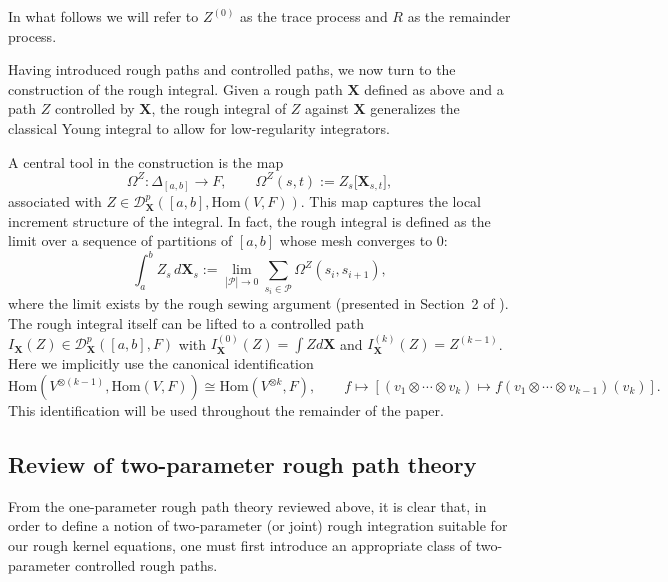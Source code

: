 \documentclass{article}%
\begin{document}
In what follows we will refer to $Z^{(0)}$ as the trace process and $R$ as the remainder process.\newline

Having introduced rough paths and controlled paths, we now turn to the construction of the rough integral.  
Given a rough path $\mathbf{X}$ defined as above and a path $Z$ controlled by $\mathbf{X}$, the rough integral of $Z$ against $\mathbf{X}$ generalizes the classical Young integral to allow for low-regularity integrators.  

A central tool in the construction is the map
\[
\Omega^Z : \Delta_{[a,b]} \to F, 
\qquad 
\Omega^Z(s,t) := Z_s\big[\mathbf{X}_{s,t}\big],
\]
associated with \(Z \in \mathcal{D}^p_{\mathbf{X}}([a,b], \mathrm{Hom}(V,F))\). This map captures the local increment structure of the integral. In fact, the rough integral is defined as the limit over a sequence of partitions of $[a,b]$ whose mesh converges to \(0\):
\[
\int_a^b Z_s \, d\mathbf{X}_s
:= \lim_{|\mathcal P| \to 0} \sum_{s_i\in \mathcal P} \Omega^Z(s_i,s_{i+1}),
\]
where the limit exists by the rough sewing argument (presented in Section~2 of \cite{cass2022combinatorial}).
The rough integral itself can be lifted to a controlled path $I_{\mathbf{X}}(Z) \in \mathcal{D}^p_{\mathbf{X}}([a,b], F)$ with $I^{(0)}_{\mathbf{X}}(Z) = \int Z d\mathbf{X}$ and $I^{(k)}_{\mathbf{X}}(Z) = Z^{(k-1)}$. Here we implicitly use the canonical identification
\[
\mathrm{Hom}\left(V^{\otimes (k-1)},\mathrm{Hom}(V,F)\right)\cong \mathrm{Hom}\left(V^{\otimes k},F\right),
\qquad
f\mapsto \left[(v_1\otimes\cdots\otimes v_k)\mapsto f(v_1\otimes\cdots\otimes v_{k-1})(v_k)\right].
\]
This identification will be used throughout the remainder of the paper. 

\subsection{Review of two-parameter rough path theory}

From the one-parameter rough path theory reviewed above, it is clear that, in order to define a notion of two-parameter (or joint) rough integration suitable for our rough kernel equations, one must first introduce an appropriate class of two-parameter controlled rough paths.
\end{document}
